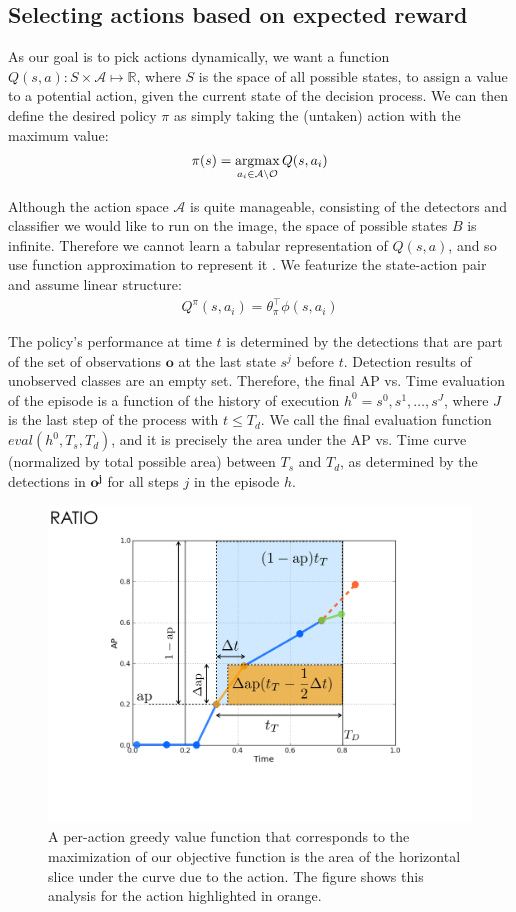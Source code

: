 \subsection{Selecting actions based on expected reward} \label{sec:value}
As our goal is to pick actions dynamically, we want a function $Q(s,a): S \times \mathcal{A} \mapsto \mathbb{R}$, where $S$ is the space of all possible states, to assign a value to a potential action, given the current state of the decision process.
We can then define the desired policy $\pi$ as simply taking the (untaken) action with the maximum value:
\begin{align}
\pi(s) = \argmax_{a_i \in \mathcal{A} \setminus \mathcal{O}} Q(s,a_i)
\end{align}

Although the action space $\mathcal{A}$ is quite manageable, consisting of the detectors and classifier we would like to run on the image, the space of possible states $B$ is infinite.
Therefore we cannot learn a tabular representation of $Q(s,a)$, and so use function approximation to represent it \cite{Sutton1998}.
We featurize the state-action pair and assume linear structure:
\begin{align}
Q^\pi(s,a_i) = \theta_\pi^\top  \phi(s,a_i)
\end{align}

The policy's performance at time $t$ is determined by the detections that are part of the set of observations $\mathbf{o}$ at the last state $s^j$ before $t$.
Detection results of unobserved classes are an empty set.
Therefore, the final AP vs. Time evaluation of the episode is a function of the history of execution $h^0=s^0,s^1,\dots,s^J$, where $J$ is the last step of the process with $t \le T_d$.
We call the final evaluation function $eval(h^0,T_s,T_d)$, and it is precisely the area under the AP vs. Time curve (normalized by total possible area) between $T_s$ and $T_d$, as determined by the detections in $\mathbf{o^j}$ for all steps $j$ in the episode $h$.

\begin{figure}[h!]
  \centering
  \includegraphics[width=0.56\linewidth]{../figures/apvst_expl.pdf}
  \caption{A per-action greedy value function that corresponds to the maximization of our objective function is the area of the horizontal slice under the curve due to the action. The figure shows this analysis for the action highlighted in orange.}
  \label{fig:rewards}
\end{figure}


